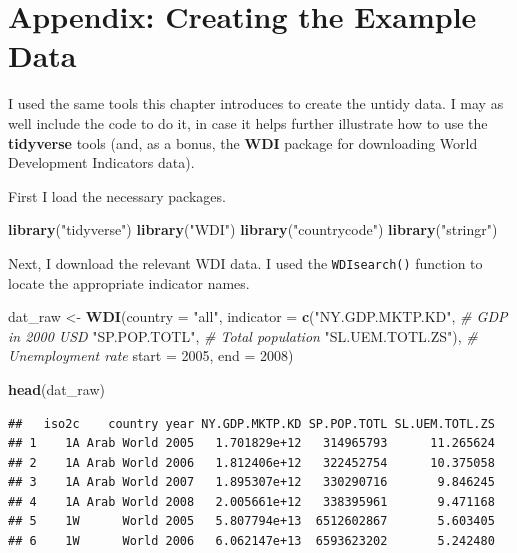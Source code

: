 \documentclass[
  12pt,
  oneside,openany]{book}
\newenvironment{Shaded}{\begin{snugshade}}{\end{snugshade}}
\newcommand{\CommentTok}[1]{\textcolor[rgb]{0.56,0.35,0.01}{\textit{#1}}}
\newcommand{\DataTypeTok}[1]{\textcolor[rgb]{0.13,0.29,0.53}{#1}}
\newcommand{\DecValTok}[1]{\textcolor[rgb]{0.00,0.00,0.81}{#1}}
\newcommand{\KeywordTok}[1]{\textcolor[rgb]{0.13,0.29,0.53}{\textbf{#1}}}
\newcommand{\NormalTok}[1]{#1}
\newcommand{\StringTok}[1]{\textcolor[rgb]{0.31,0.60,0.02}{#1}}
\begin{document}
\hypertarget{appendix-creating-the-example-data}{%
\section{Appendix: Creating the Example Data}\label{appendix-creating-the-example-data}}

I used the same tools this chapter introduces to create the untidy data. I may as well include the code to do it, in case it helps further illustrate how to use the \textbf{tidyverse} tools (and, as a bonus, the \textbf{WDI} package for downloading World Development Indicators data).

First I load the necessary packages.

\begin{Shaded}
\begin{Highlighting}[]
\KeywordTok{library}\NormalTok{(}\StringTok{"tidyverse"}\NormalTok{)}
\KeywordTok{library}\NormalTok{(}\StringTok{"WDI"}\NormalTok{)}
\KeywordTok{library}\NormalTok{(}\StringTok{"countrycode"}\NormalTok{)}
\KeywordTok{library}\NormalTok{(}\StringTok{"stringr"}\NormalTok{)}
\end{Highlighting}
\end{Shaded}

Next, I download the relevant WDI data. I used the \texttt{WDIsearch()} function to locate the appropriate indicator names.

\begin{Shaded}
\begin{Highlighting}[]
\NormalTok{dat\_raw <{-}}\StringTok{ }\KeywordTok{WDI}\NormalTok{(}\DataTypeTok{country =} \StringTok{"all"}\NormalTok{,}
               \DataTypeTok{indicator =} \KeywordTok{c}\NormalTok{(}\StringTok{"NY.GDP.MKTP.KD"}\NormalTok{,  }\CommentTok{\# GDP in 2000 USD}
                             \StringTok{"SP.POP.TOTL"}\NormalTok{,     }\CommentTok{\# Total population}
                             \StringTok{"SL.UEM.TOTL.ZS"}\NormalTok{), }\CommentTok{\# Unemployment rate}
               \DataTypeTok{start =} \DecValTok{2005}\NormalTok{,}
               \DataTypeTok{end =} \DecValTok{2008}\NormalTok{)}

\KeywordTok{head}\NormalTok{(dat\_raw)}
\end{Highlighting}
\end{Shaded}

\begin{verbatim}
##   iso2c    country year NY.GDP.MKTP.KD SP.POP.TOTL SL.UEM.TOTL.ZS
## 1    1A Arab World 2005   1.701829e+12   314965793      11.265624
## 2    1A Arab World 2006   1.812406e+12   322452754      10.375058
## 3    1A Arab World 2007   1.895307e+12   330290716       9.846245
## 4    1A Arab World 2008   2.005661e+12   338395961       9.471168
## 5    1W      World 2005   5.807794e+13  6512602867       5.603405
## 6    1W      World 2006   6.062147e+13  6593623202       5.242480
\end{verbatim}
\end{document}
